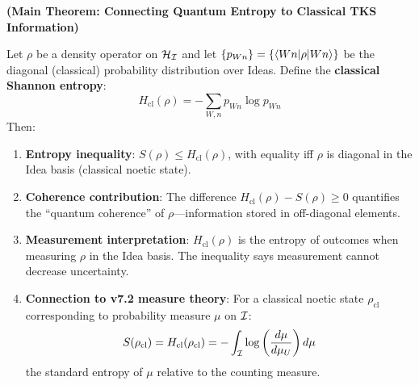 \begin{theorem}
\label{thm:entropy-info-correspondence}
\textbf{(Main Theorem: Connecting Quantum Entropy to Classical TKS Information)}

Let $\rho$ be a density operator on $\mathcal{H}_{\mathcal{I}}$ and let $\{p_{Wn}\} = \{\langle Wn|\rho|Wn\rangle\}$ be the diagonal (classical) probability distribution over Ideas. Define the \textbf{classical Shannon entropy}:
\[
H_{\mathrm{cl}}(\rho) = -\sum_{W,n} p_{Wn} \log p_{Wn}
\]
Then:
\begin{enumerate}
  \item \textbf{Entropy inequality}: $S(\rho) \leq H_{\mathrm{cl}}(\rho)$, with equality iff $\rho$ is diagonal in the Idea basis (classical noetic state).

  \item \textbf{Coherence contribution}: The difference $H_{\mathrm{cl}}(\rho) - S(\rho) \geq 0$ quantifies the ``quantum coherence'' of $\rho$---information stored in off-diagonal elements.

  \item \textbf{Measurement interpretation}: $H_{\mathrm{cl}}(\rho)$ is the entropy of outcomes when measuring $\rho$ in the Idea basis. The inequality says measurement cannot decrease uncertainty.

  \item \textbf{Connection to v7.2 measure theory}: For a classical noetic state $\rho_{\mathrm{cl}}$ corresponding to probability measure $\mu$ on $\mathcal{I}$:
  \[
  S(\rho_{\mathrm{cl}}) = H_{\mathrm{cl}}(\rho_{\mathrm{cl}}) = -\int_{\mathcal{I}} \log\left(\frac{d\mu}{d\mu_U}\right) d\mu
  \]
  the standard entropy of $\mu$ relative to the counting measure.
\end{enumerate}
\end{theorem}

